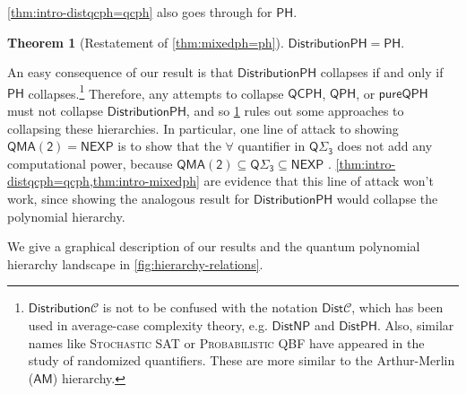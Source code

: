\documentclass[10pt,a4paper]{article}
\newtheorem{theorem}{Theorem}[section]
\theoremstyle{definition}
\newcommand{\class}[1]{\ensuremath{\mathsf{#1}}\xspace}
\newcommand{\NEXP}{\class{NEXP}}
\newcommand{\QMAk}[1][k]{\class{QMA(#1)}}
\newcommand{\QMAtwo}{\QMAk[2]}
\newcommand{\PH}{\class{PH}}
\newcommand{\QCPH}{\class{QCPH}}
\newcommand{\QPH}{\class{QPH}}
\newcommand{\QSigmai}[1][i]{\class{Q\Sigma_{#1}}}
\newcommand{\pureQPH}{\class{pureQPH}}
\newcommand{\distributionPH}{\mixedPH}
\newcommand{\mixedPH}{\class{DistributionPH}}
\newcommand{\prob}[1]{\textsc{#1}}
\newcommand{\calC}{\mathcal{C}}
\newcommand{\eg}{e.g.\xspace}
\begin{document}
\cref{thm:intro-distqcph=qcph} also goes through for $\PH$. 

\begin{theorem}[Restatement of \cref{thm:mixedph=ph}]\label{thm:intro-mixedph}
   $\distributionPH = \PH.$
\end{theorem}

An easy consequence of our result is that $\distributionPH$ collapses if and only if $\PH$ collapses.\footnote{$\class{Distribution}\calC$ is not to be confused with the notation $\class{Dist}\calC$, which has been used in average-case complexity theory, \eg{} $\class{DistNP}$ and $\class{DistPH}$.
Also, similar names like \prob{Stochastic SAT} or \prob{Probabilistic QBF} have appeared in the study of randomized quantifiers. These are more similar to the Arthur-Merlin ($\class{AM}$) hierarchy. 
}
Therefore, any attempts to collapse $\QCPH$, $\QPH$, or $\pureQPH$ must not collapse $\distributionPH$, and so \cref{thm:intro-mixedph} rules out some approaches to collapsing these hierarchies.
In particular, one line of attack to showing $\QMAtwo = \NEXP$ is to show that the $\forall$ quantifier in $\QSigmai[3]$ does not add any computational power, because $\QMAtwo \subseteq \QSigmai[3] \subseteq \NEXP$ \cite{GSSSY22_qph}. \cref{thm:intro-distqcph=qcph,thm:intro-mixedph} are evidence that this line of attack won't work, since showing the analogous result for $\distributionPH$ would collapse the polynomial hierarchy. 


We give a graphical description of our results and the quantum polynomial hierarchy landscape in \cref{fig:hierarchy-relations}.
\end{document}
